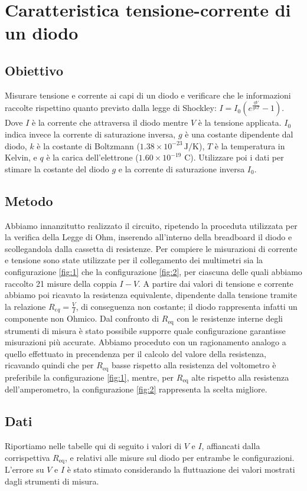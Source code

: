 \documentclass[a4paper]{article}
\begin{document}
\section{Caratteristica tensione-corrente di un diodo}
\subsection{Obiettivo}
Misurare tensione e corrente ai capi di un diodo e verificare che le informazioni raccolte rispettino quanto previsto dalla legge di Shockley: $I = I_0 \left( e^{\frac{qV}{gkT}} - 1 \right)$.
Dove $I$ è la corrente che attraversa il diodo mentre $V$ è la tensione applicata. $I_0$ indica invece la corrente di saturazione inversa, $g$ è una costante dipendente dal diodo,
$k$ è la costante di Boltzmann ($1.38 \times 10^{-23} \, \text{J/K}$), $T$ è la temperatura in Kelvin, e $q$ è la carica dell'elettrone ($1.60 \times 10^{-19}$ C).
Utilizzare poi i dati per stimare la costante del diodo $g$ e la corrente di saturazione inversa $I_0$.
\subsection{Metodo}
Abbiamo innanzitutto realizzato il circuito, ripetendo la proceduta utilizzata per la verifica della Legge di Ohm, inserendo all'interno della breadboard il diodo e scollegandola dalla cassetta di resistenze.
Per compiere le misurazioni di corrente e tensione sono state utilizzate per il collegamento dei multimetri sia la configurazione \ref{fig:1} che la configurazione \ref{fig:2},
per ciascuna delle quali abbiamo raccolto 21 misure della coppia \( I-V \). A partire dai valori di tensione e corrente abbiamo poi ricavato la resistenza equivalente,
dipendente dalla tensione tramite la relazione \( R_{eq} = \frac {V}{I} \), di conseguenza non costante; il diodo rappresenta infatti un componente non Ohmico.
Dal confronto di $R_{\text{eq}}$ con le resistenze interne degli strumenti di misura è stato possibile supporre quale configurazione garantisse misurazioni più accurate.
Abbiamo proceduto con un ragionamento analogo a quello effettuato in precendenza per il calcolo del valore della resistenza, ricavando quindi che per $R_{\text{eq}}$ basse rispetto alla resistenza del voltometro è preferibile la configurazione \ref{fig:1}, mentre, per $R_{\text{eq}}$ alte rispetto alla resistenza dell'amperometro, la configurazione \ref{fig:2} rappresenta la scelta migliore.
\subsection{Dati}
Riportiamo nelle tabelle qui di seguito i valori di \(V\) e \(I\), affiancati dalla corrispettiva \(R_{\text{eq}}\), e relativi alle misure sul diodo per entrambe le configurazioni. L'errore su \(V\) e \(I\) è stato stimato considerando la fluttuazione dei valori mostrati dagli strumenti di misura.
\end{document}
